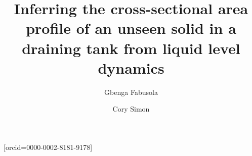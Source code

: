 \documentclass[a4paper,fleqn]{cas-dc}
\begin{document}
\let\WriteBookmarks\relax
\def\floatpagepagefraction{1}
\def\textpagefraction{.001}

\shorttitle{}    

\shortauthors{}  

\title [mode = title]{
Inferring the cross-sectional area profile of an unseen solid in a draining tank from liquid level dynamics
 }  

\tnotemark[1] 

\tnotetext[1]{} 

%

\author[1]{Gbenga Fabusola}%

\credit{}


\author[1]{Cory Simon}[orcid=0000-0002-8181-9178]

\cormark[1]


\ead[url]{}

\credit{}



\fntext[1]{}

\end{document}
